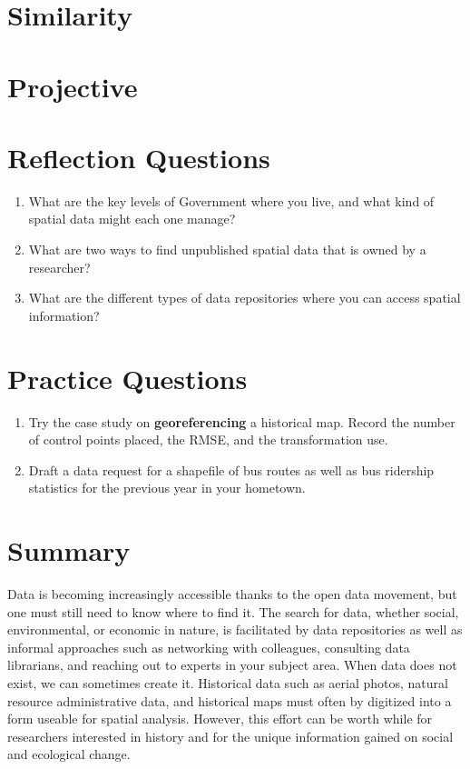\documentclass[
]{book}
\providecommand{\tightlist}{%
  \setlength{\itemsep}{0pt}\setlength{\parskip}{0pt}}
\begin{document}
\hypertarget{similarity}{%
\section{Similarity}\label{similarity}}

\hypertarget{projective}{%
\section{Projective}\label{projective}}

\hypertarget{reflection-questions-2}{%
\section{Reflection Questions}\label{reflection-questions-2}}

\begin{enumerate}
\def\labelenumi{\arabic{enumi}.}
\tightlist
\item
  What are the key levels of Government where you live, and what kind of spatial data might each one manage?
\item
  What are two ways to find unpublished spatial data that is owned by a researcher?
\item
  What are the different types of data repositories where you can access spatial information?
\end{enumerate}

\hypertarget{practice-questions-2}{%
\section{Practice Questions}\label{practice-questions-2}}

\begin{enumerate}
\def\labelenumi{\arabic{enumi}.}
\tightlist
\item
  Try the case study on \textbf{georeferencing} a historical map. Record the number of control points placed, the RMSE, and the transformation use.
\item
  Draft a data request for a shapefile of bus routes as well as bus ridership statistics for the previous year in your hometown.
\end{enumerate}

\hypertarget{summary-3}{%
\section{Summary}\label{summary-3}}

Data is becoming increasingly accessible thanks to the open data movement, but one must still need to know where to find it. The search for data, whether social, environmental, or economic in nature, is facilitated by data repositories as well as informal approaches such as networking with colleagues, consulting data librarians, and reaching out to experts in your subject area. When data does not exist, we can sometimes create it. Historical data such as aerial photos, natural resource administrative data, and historical maps must often by digitized into a form useable for spatial analysis. However, this effort can be worth while for researchers interested in history and for the unique information gained on social and ecological change.
\end{document}
